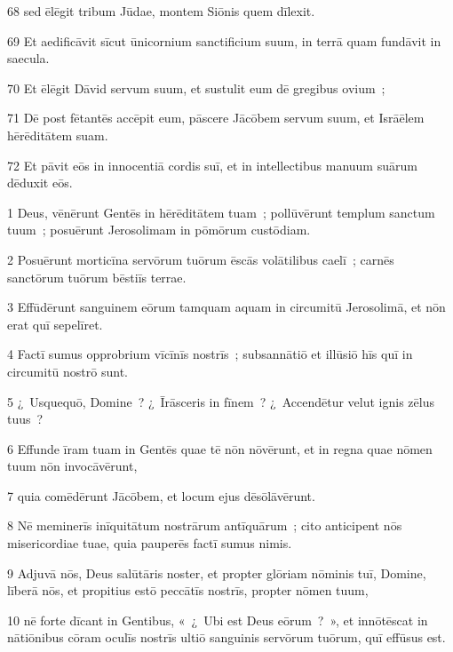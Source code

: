\psalmVerse
  {\phantom{0}68}
  {sed ēlēgit tribum Jūdae, montem Siōnis quem dīlexit.}


\psalmVerse
  {\phantom{0}69}
  {Et aedificāvit sīcut ūnicornium sanctificium suum, in terrā quam fundāvit in saecula.}


\psalmVerse
  {\phantom{0}70}
  {Et ēlēgit Dāvid servum suum, et sustulit eum dē gregibus ovium~;}


\psalmVerse
  {\phantom{0}71}
  {Dē post fētantēs accēpit eum, pāscere Jācōbem servum suum, et Isrāēlem hērēditātem suam.}


\psalmVerse
  {\phantom{0}72}
  {Et pāvit eōs in innocentiā cordis suī, et in intellectibus manuum suārum dēduxit eōs.}




\psalmVerse
  {\phantom{00}1}
  {Deus, vēnērunt Gentēs in hērēditātem tuam~; pollūvērunt templum sanctum tuum~; posuērunt Jerosolimam in pōmōrum custōdiam.}


\psalmVerse
  {\phantom{00}2}
  {Posuērunt morticīna servōrum tuōrum ēscās volātilibus caelī~; carnēs sanctōrum tuōrum bēstiīs terrae.}


\psalmVerse
  {\phantom{00}3}
  {Effūdērunt sanguinem eōrum tamquam aquam in circumitū Jerosolimā, et nōn erat quī sepelīret.}


\psalmVerse
  {\phantom{00}4}
  {Factī sumus opprobrium vīcīnīs nostrīs~; subsannātiō et illūsiō hīs quī in circumitū nostrō sunt.}


\psalmVerse
  {\phantom{00}5}
  {¿~Usquequō, Domine~? ¿~Īrāsceris in fīnem~? ¿~Accendētur velut ignis zēlus tuus~?}


\psalmVerse
  {\phantom{00}6}
  {Effunde īram tuam in Gentēs quae tē nōn nōvērunt, et in regna quae nōmen tuum nōn invocāvērunt,}


\psalmVerse
  {\phantom{00}7}
  {quia comēdērunt Jācōbem, et locum ejus dēsōlāvērunt.}


\psalmVerse
  {\phantom{00}8}
  {Nē meminerīs inīquitātum nostrārum antīquārum~; cito anticipent nōs misericordiae tuae, quia pauperēs factī sumus nimis.}


\psalmVerse
  {\phantom{00}9}
  {Adjuvā nōs, Deus salūtāris noster, et propter glōriam nōminis tuī, Domine, līberā nōs, et propitius estō peccātīs nostrīs, propter nōmen tuum,}


\psalmVerse
  {\phantom{0}10}
  {nē forte dīcant in Gentibus, «~¿~Ubi est Deus eōrum~?~», et innōtēscat in nātiōnibus cōram oculīs nostrīs ultiō sanguinis servōrum tuōrum, quī effūsus est.}


